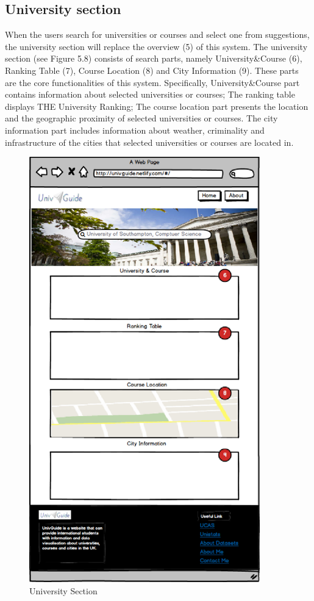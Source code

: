 \subsection{University section
}

When the users search for universities or courses and select one from suggestions, the university section will replace the overview (5) of this system. The university section (see Figure 5.8) consists of search parts, namely University\&Course (6), Ranking Table (7), Course Location (8) and City Information (9). These parts are the core functionalities of this system. Specifically, University\&Course part contains information about selected universities or courses; The ranking table displays THE University Ranking; The course location part presents the location and the geographic proximity of selected universities or courses. The city information part includes information about weather, criminality and infrastructure of the cities that selected universities or courses are located in.



\begin{figure}[H]
  \centering
  \includegraphics[width=10cm]{./img/Picture14}
  \caption{University Section}
  \label{Figure:figex}
\end{figure}



